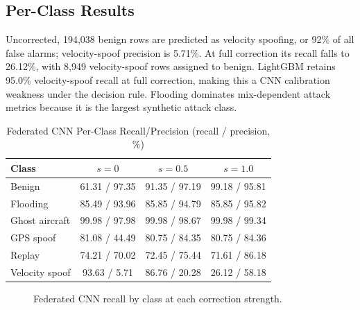 \documentclass[conference]{IEEEtran}
\begin{document}
\subsection{Per-Class Results}
Uncorrected, 194,038 benign rows are predicted as velocity spoofing, or 92\% of all false alarms; velocity-spoof precision is 5.71\%. At full correction its recall falls to 26.12\%, with 8,949 velocity-spoof rows assigned to benign. LightGBM retains 95.0\% velocity-spoof recall at full correction, making this a CNN calibration weakness under the decision rule. Flooding dominates mix-dependent attack metrics because it is the largest synthetic attack class.
\begin{table}[!t]
\caption{Federated CNN Per-Class Recall/Precision (recall / precision, \%)}
\label{tab:perclass}
\centering
\scriptsize
\begin{tabular}{lccc}
\toprule
Class & $s=0$ & $s=0.5$ & $s=1.0$ \\
\midrule
Benign & 61.31 / 97.35 & 91.35 / 97.19 & 99.18 / 95.81 \\
Flooding & 85.49 / 93.96 & 85.85 / 94.79 & 85.85 / 95.82 \\
Ghost aircraft & 99.98 / 97.98 & 99.98 / 98.67 & 99.98 / 99.34 \\
GPS spoof & 81.08 / 44.49 & 80.75 / 84.35 & 80.75 / 84.36 \\
Replay & 74.21 / 70.02 & 72.45 / 75.44 & 71.61 / 86.18 \\
Velocity spoof & 93.63 / 5.71 & 86.76 / 20.28 & 26.12 / 58.18 \\
\bottomrule
\end{tabular}
\end{table}
\begin{figure}[t]\centering{}\caption{Federated CNN recall by class at each correction strength.}\label{fig:classrecall}\end{figure}
\end{document}
